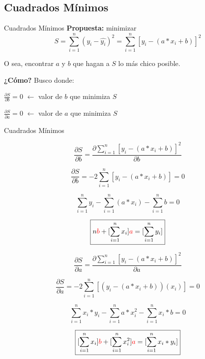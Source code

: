 \documentclass[xcolor=svgnames]{beamer} %
\theoremstyle{plain}
\renewcommand{\textbf}[1]{{\bfseries\textcolor{redUnq2}{#1}}}
\theoremstyle{definition}
\begin{document}
\subsection{Cuadrados Mínimos}

\begin{frame}{Cuadrados Mínimos}
  \textbf{Propuesta:} minimizar 
  $$ S = \sum_{i=1}^n (y_i - \hat{y_i})^2 = \sum_{i=1}^n  \left[y_i - (a* x_i +b)\right]^2 $$ \pause
  
  O sea, encontrar $a$ y $b$ que hagan a $S$ lo más chico posible. \pause
  
  \textbf{¿Cómo?}
  Busco donde:\vspace{15pt}
  
  $\frac{\partial S}{\partial b} = 0$ $\leftarrow$ valor de $b$ que minimiza $S$\vspace{15pt}
  
  $\frac{\partial S}{\partial a} = 0$ $\leftarrow$ valor de $a$ que minimiza $S$

\end{frame}


\begin{frame}{Cuadrados Mínimos}
\begin{minipage}{.45\linewidth}
{\footnotesize

$$ \frac{\partial S}{\partial b} = \frac{\partial \sum_{i=1}^n\left[y_i - (a* x_i +b)\right]^2}{\partial b} $$

$$ \frac{\partial S}{\partial b} =  -2 \sum_{i=1}^n\left[y_i - (a* x_i +b)\right] = 0 $$

$$ \sum_{i=1}^n y_i - \sum_{i=1}^n (a*x_i) - \sum_{i=1}^n b = 0$$

$$\boxed{n {\color{red} b} + [\sum_{i=1}^n x_i] {\color{red} a} =  [\sum_{i=1}^n y_i] }$$
}
\end{minipage}\hspace{2pt} \vline\hspace{2pt} \begin{minipage}{.45\linewidth}
{\footnotesize

$$\frac{\partial S}{\partial a} = \frac{\partial \sum_{i=1}^n\left[y_i - (a* x_i +b)\right]^2}{\partial a} $$

$$\frac{\partial S}{\partial a} = -2\sum_{i=1}^n\left[(y_i - (a* x_i +b))(x_i) \right] = 0   $$

$$\sum_{i=1}^n x_i* y_i - \sum_{i=1}^n a*x_i^2- \sum_{i=1}^n x_i*b = 0 $$

$$\boxed{[\sum_{i=1}^n x_i]{\color{red}b} + [\sum_{i=1}^n x_i^2]{\color{red}a} = [\sum_{i=1}^n x_i*y_i]  } $$

}
\end{minipage} 
\end{frame}
\end{document}
